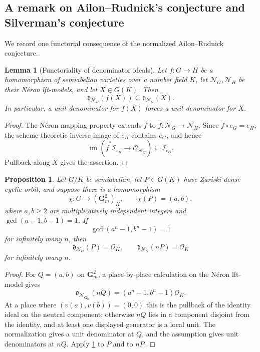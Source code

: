 \documentclass[11pt,letterpaper,reqno]{amsart}
\newtheorem{proposition}[theorem]{Proposition}
\newtheorem{lemma}[theorem]{Lemma}
\theoremstyle{definition}
\theoremstyle{remark}
\newcommand{\Gm}{\mathbf G_m}
\begin{document}
\subsection{A remark on Ailon--Rudnick's conjecture and Silverman's conjecture}
\label{subsec:ar-conditional-pullback}

We record one functorial consequence of the normalized Ailon--Rudnick
conjecture.  

\begin{lemma}[Functoriality of denominator ideals]
\label{lem:ar-functorial-denominator}
Let $f:G\to H$ be a homomorphism of semiabelian varieties over a number field
$K$, let $\mathcal N_G,\mathcal N_H$ be their N\'eron lft-models, and let
$X\in G(K)$.  Then
\[
        \mathfrak d_{\mathcal N_H}(f(X))
        \subseteq
        \mathfrak d_{\mathcal N_G}(X).
\]
In particular, a unit denominator for $f(X)$ forces a unit denominator for
$X$.
\end{lemma}

\begin{proof}
The N\'eron mapping property extends $f$ to
$\widetilde f:\mathcal N_G\to\mathcal N_H$.  Since
$\widetilde f\circ e_G=e_H$, the scheme-theoretic inverse image of $e_H$
contains $e_G$, and hence
\[
        \operatorname{im}
        (\widetilde f^*\mathcal I_{e_H}\to\mathcal O_{\mathcal N_G})
        \subseteq\mathcal I_{e_G}.
\]
Pullback along $X$ gives the assertion.
\end{proof}

\begin{proposition}
\label{prop:ar-conditional-pullback}
Let $G/K$ be semiabelian, let $P\in G(K)$ have Zariski-dense cyclic orbit,
and suppose there is a homomorphism
\[
        \chi:G\longrightarrow(\Gm^2)_K,
        \qquad \chi(P)=(a,b),
\]
where $a,b\ge2$ are multiplicatively independent integers and
$\gcd(a-1,b-1)=1$.  If
\[
        \gcd(a^n-1,b^n-1)=1
\]
for infinitely many $n$, then
\[
        \mathfrak d_{\mathcal N_G}(P)=\mathcal O_K,
        \qquad
        \mathfrak d_{\mathcal N_G}(nP)=\mathcal O_K
\]
for infinitely many $n$.  
\end{proposition}

\begin{proof}
For $Q=(a,b)$ on $\Gm^2$, a place-by-place calculation on the N\'eron
lft-model gives
\[
        \mathfrak d_{\mathcal N_{\Gm^2}}(nQ)
        =(a^n-1,b^n-1)\mathcal O_K.
\]
At a place where $(v(a),v(b))=(0,0)$ this is the pullback of the identity
ideal on the neutral component; otherwise $nQ$ lies in a component disjoint
from the identity, and at least one displayed generator is a local unit.
The normalization gives a unit denominator at $Q$, and the assumption gives unit denominators at $nQ$.  Apply
\cref{lem:ar-functorial-denominator} to $P$ and to $nP$.
\end{proof}
\end{document}
